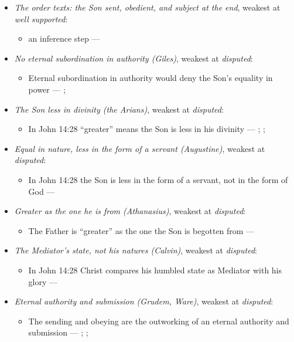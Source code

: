 \documentclass[11pt,paper=\testimonypaper,DIV=13,parskip=false]{scrartcl}
\begin{document}
\begin{itemize}
\item \emph{The order texts: the Son sent, obedient, and subject at the end}, weakest at \emph{well supported}:
\begin{itemize}
\item an inference step --- \cite[3, The Triune God]{kibbey-living-systematic-theology-2026}
\end{itemize}
\item \emph{No eternal subordination in authority (Giles)}, weakest at \emph{disputed}:
\begin{itemize}
\item Eternal subordination in authority would deny the Son’s equality in power --- \cite[323]{giles-ets-trinity-2008}; \cite{giles-jesus-and-the-father-2006}
\end{itemize}
\item \emph{The Son less in divinity (the Arians)}, weakest at \emph{disputed}:
\begin{itemize}
\item In John 14:28 “greater” means the Son is less in his divinity --- \cite[De Synodis 28]{schaff-nicene-post-nicene-fathers-2-4-1892}; \cite[On the Trinity I.7.14]{schaff-nicene-post-nicene-fathers-1-3-1887}; \cite[102]{calvin-commentary-john-2-1847}
\end{itemize}
\item \emph{Equal in nature, less in the form of a servant (Augustine)}, weakest at \emph{disputed}:
\begin{itemize}
\item In John 14:28 the Son is less in the form of a servant, not in the form of God --- \cite[On the Trinity I.7.14]{schaff-nicene-post-nicene-fathers-1-3-1887}
\end{itemize}
\item \emph{Greater as the one he is from (Athanasius)}, weakest at \emph{disputed}:
\begin{itemize}
\item The Father is “greater” as the one the Son is begotten from --- \cite[Against the Arians I.13.58]{schaff-nicene-post-nicene-fathers-2-4-1892}
\end{itemize}
\item \emph{The Mediator’s state, not his natures (Calvin)}, weakest at \emph{disputed}:
\begin{itemize}
\item In John 14:28 Christ compares his humbled state as Mediator with his glory --- \cite[102--103]{calvin-commentary-john-2-1847}
\end{itemize}
\item \emph{Eternal authority and submission (Grudem, Ware)}, weakest at \emph{disputed}:
\begin{itemize}
\item The sending and obeying are the outworking of an eternal authority and submission --- \cite[40]{grudem-doctrinal-deviations-2015}; \cite{grudem-ets-trinity-2016}; \cite{ware-father-son-holy-spirit-2005}
\end{itemize}
\end{itemize}
\end{document}

